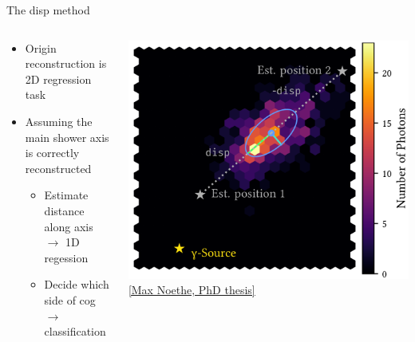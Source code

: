 \begin{frame}{The disp method}
    \begin{columns}[onlytextwidth]
        \begin{column}{0.475\textwidth}
            \begin{itemize}
                \setlength\itemsep{1em}
                \item Origin reconstruction is 2D regression task 
                \item Assuming the main shower axis is correctly reconstructed\\
                    \begin{itemize}
                        \item[\textbf{\textcolor{tugreen}{\to}}] Estimate distance along axis $\to$ 1D regession
                        \item[\textbf{\textcolor{tugreen}{\to}}] Decide which side of cog $\to$ classification
                    \end{itemize}
            \end{itemize}
        \end{column}
        \begin{column}{0.475\textwidth}
            \centering
            \includegraphics[width=\textwidth]{images/disp.png}\\[-0.5\baselineskip]
            \hspace{1.5cm}\href{https://github.com/MaxNoe/phd_thesis}{[Max Noethe, PhD thesis]}
        \end{column}
    \end{columns}

\end{frame}